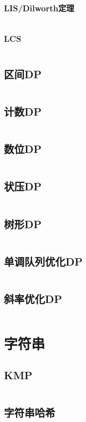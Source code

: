 \documentclass[a4paper,12pt]{article}
\begin{document}
\subsubsection{LIS/Dilworth定理}
\inputminted[breaklines]{c++}{dp/linear/lis.cc}
\subsubsection{LCS}
\inputminted[breaklines]{c++}{dp/linear/lcs.cc}
\subsection{区间DP}
\inputminted[breaklines]{c++}{dp/interval.cc}
\subsection{计数DP}
\inputminted[breaklines]{c++}{dp/jishu.cc}
\subsection{数位DP}
\inputminted[breaklines]{c++}{dp/shuwei.cc}
\subsection{状压DP}
\inputminted[breaklines]{c++}{dp/zhuangya.cc}
\subsection{树形DP}
\inputminted[breaklines]{c++}{dp/treedp.cc}
\subsection{单调队列优化DP}
\inputminted[breaklines]{c++}{dp/dddl.cc}
\subsection{斜率优化DP}
\inputminted[breaklines]{c++}{dp/xielv.cc}


\newpage
\section{字符串}
\subsection{KMP}
\inputminted[breaklines]{c++}{string/kmp.cc}
\subsection{字符串哈希}
\inputminted[breaklines]{c++}{string/hash.cc}
\end{document}
